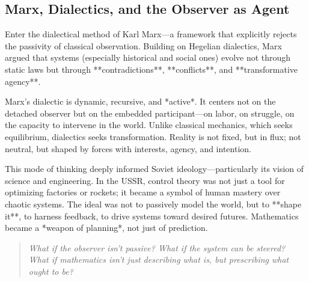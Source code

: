 \subsection{Marx, Dialectics, and the Observer as Agent}

Enter the dialectical method of Karl Marx—a framework that explicitly rejects the passivity of classical observation. Building on Hegelian dialectics, Marx argued that systems (especially historical and social ones) evolve not through static laws but through **contradictions**, **conflicts**, and **transformative agency**.

Marx's dialectic is dynamic, recursive, and *active*. It centers not on the detached observer but on the embedded participant—on labor, on struggle, on the capacity to intervene in the world. Unlike classical mechanics, which seeks equilibrium, dialectics seeks transformation. Reality is not fixed, but in flux; not neutral, but shaped by forces with interests, agency, and intention.

This mode of thinking deeply informed Soviet ideology—particularly its vision of science and engineering. In the USSR, control theory was not just a tool for optimizing factories or rockets; it became a symbol of human mastery over chaotic systems. The ideal was not to passively model the world, but to **shape it**, to harness feedback, to drive systems toward desired futures. Mathematics became a *weapon of planning*, not just of prediction.

\begin{quote}
\emph{What if the observer isn’t passive? What if the system can be steered? What if mathematics isn't just describing what is, but prescribing what ought to be?}
\end{quote}

